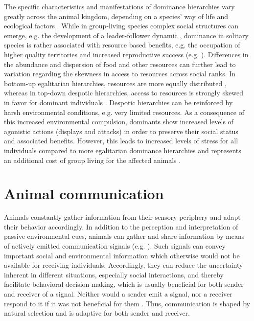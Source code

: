 The specific characteristics and manifestations of dominance hierarchies vary greatly across the animal kingdom, depending on a species' way of life and ecological factors \citep{Janson1985, Cigliano1993, Sapolsky2005}. While in group-living species complex social structures can emerge, e.g. the development of a leader-follower dynamic \citep{Strandburg2018}, dominance in solitary species is rather associated with resource based benefits, e.g. the occupation of higher quality territories and increased reproductive success (e.g. \citealp{Cigliano1993}). Differences in the abundance and dispersion of food and other resources can further lead to variation regarding the skewness in access to resources across social ranks. In bottom-up egalitarian hierarchies, resources are more equally distributed \citep{Sapolsky2005}, whereas in top-down despotic hierarchies, access to resources is strongly skewed in favor for dominant individuals \citep{Kappeler2008}. Despotic hierarchies can be reinforced by harsh environmental conditions, e.g. very limited resources. As a consequence of this increased environmental compulsion, dominants show increased levels of agonistic actions (displays and attacks) in order to preserve their social status and associated benefits. However, this leads to increased levels of stress for all individuals compared to more egalitarian dominance hierarchies and represents an additional cost of group living for the affected animals \citep{Janson1985, Creel1996, Cavigelli1999, Sapolsky2005, Kappeler2008}.


\section{Animal communication}
Animals constantly gather information from their sensory periphery and adapt their behavior accordingly. In addition to the perception and interpretation of passive environmental cues, animals can gather and share information by means of actively emitted communication signals (e.g. \citealp{Demartsev2018, Cornhill2020, Ritschard2010}). Such signals can convey important social and environmental information which otherwise would not be available for receiving individuals. Accordingly, they can reduce the uncertainty inherent in different situations, especially social interactions, and thereby facilitate behavioral decision-making, which is usually beneficial for both sender and receiver of a signal. Neither would a sender emit a signal, nor a receiver respond to it if it was not beneficial for them \citep{Seyfarth2017}. Thus, communication is shaped by natural selection and is adaptive for both sender and receiver.

